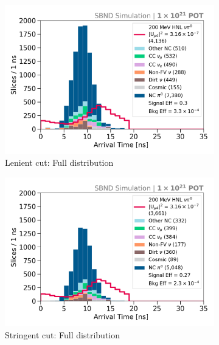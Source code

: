 \begin{figure}[bp!]
	\hfill
	\begin{subfigure}[b]{0.495\textwidth}   
            \centering 
            \includegraphics[width=\textwidth]{bb_lenient_full}
            \caption{Lenient cut: Full distribution}%
	    \label{fig:bb_full_loose}
        \end{subfigure}
        \hfill
	\begin{subfigure}[b]{0.495\textwidth}   
            \centering 
            \includegraphics[width=\textwidth]{bb_stringent_full}
            \caption{Stringent cut: Full distribution}%
	    \label{fig:bb_full_strict}
        \end{subfigure}
	\hfill
        \begin{subfigure}[b]{0.495\textwidth}   

\end{subfigure}
\end{figure}
